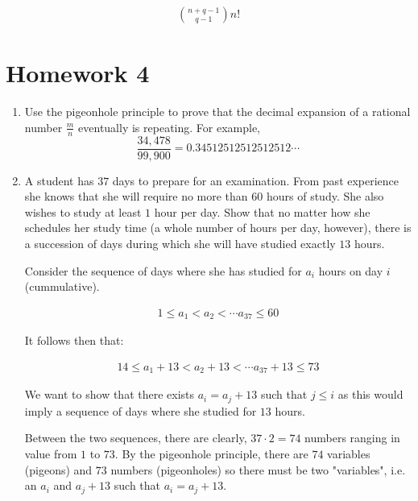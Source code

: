\documentclass{report}
\begin{document}
{\begin{enumerate}
{              \begin{align*}
                  \binom{n+q-1}{q-1}n!
              \end{align*}
          }


\end{enumerate}

\section{Homework 4}

\begin{enumerate}
    \item Use the pigeonhole principle to prove that the decimal expansion of a rational
          number $\frac{m}{n}$ eventually is repeating. For example,
          $$\frac{34,478}{99,900} = 0.34512512512512512\cdots$$

    \item A student has $37$ days to prepare for an examination. From past experience she
          knows that she will require no more than $60$ hours of study. She also wishes to
          study at least $1$ hour per day. Show that no matter how she schedules her study
          time (a whole number of hours per day, however), there is a succession of days
          during which she will have studied exactly $13$ hours.

          Consider the sequence of days where she has studied for $a_i$
          hours on day $i$ (cummulative).

          \begin{align*}
              1 \le a_1 < a_2 < \cdots a_{37} \le 60
          \end{align*}

          It follows then that:

          \begin{align*}
              14 \le a_1 + 13 < a_2 + 13 < \cdots a_{37} + 13 \le 73
          \end{align*}

          We want to show that there exists $a_i = a_j + 13$ such that $j \le i$ as
          this would imply a sequence of days where she studied for $13$ hours.

          Between the two sequences, there are clearly, $37\cdot2 = 74$ numbers ranging in
          value from $1$ to $73$. By the pigeonhole principle, there
          are $74$ variables (pigeons) and $73$ numbers (pigeonholes) so
          there must be two "variables", i.e. an $a_i$ and $a_j + 13$
          such that $a_i = a_j + 13$.


\end{enumerate}}
\end{document}
